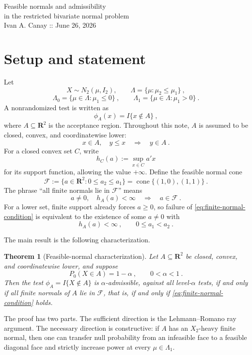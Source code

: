 \documentclass[12pt]{article}
\newtheorem{theorem}{Theorem}
\theoremstyle{remark}
\begin{document}
\begin{center}
{\Large Feasible normals and admissibility\\ in the restricted bivariate normal problem}\\[3pt]
{\small Ivan A. Canay :: June 26, 2026} 
\end{center}

\medskip

\section*{Setup and statement}

Let
\[
X\sim N_2(\mu,I_2),
\qquad
\Lambda=\{\mu:\mu_2\le \mu_1\}~,
\]
\[
\Lambda_0=\{\mu\in\Lambda:\mu_1\le0\}~,
\qquad
\Lambda_1=\{\mu\in\Lambda:\mu_1>0\}~.
\]
A nonrandomized test is written as
\[
\phi_A(x)=I\{x\notin A\}~,
\]
where $A\subseteq\mathbf R^2$ is the acceptance region.  Throughout this note,
$A$ is assumed to be closed, convex, and coordinatewise lower:
\[
x\in A,
\quad y\le x
\quad\Longrightarrow\quad
 y\in A~.
\]
For a closed convex set $C$, write
\[
h_C(a):=\sup_{x\in C}a'x
\]
for its support function, allowing the value $+\infty$.  Define the feasible normal cone
\[
\mathcal F:=\{a\in\mathbf R^2:0\le a_2\le a_1\}
=\operatorname{cone}\{(1,0),(1,1)\}~.
\]
The phrase ``all finite normals lie in $\mathcal F$'' means
\begin{equation}\label{eq:finite-normal-condition}
    a\ne0,
    \quad h_A(a)<\infty
    \quad\Longrightarrow\quad
    a\in\mathcal F~.
\end{equation}
For a lower set, finite support already forces $a\ge0$, so failure of
\eqref{eq:finite-normal-condition} is equivalent to the existence of some
$a\ne0$ with
\[
h_A(a)<\infty~,
\qquad
0\le a_1<a_2~.
\]

The main result is the following characterization.

\begin{theorem}[Feasible-normal characterization]\label{thm:iff}
Let $A\subseteq\mathbf R^2$ be closed, convex, and coordinatewise lower, and suppose
\[
P_0(X\in A)=1-\alpha~,
\qquad 0<\alpha<1~.
\]
Then the test $\phi_A=I\{X\notin A\}$ is $\alpha$-admissible, against all level-$\alpha$ tests, if and only if all finite normals of $A$ lie in $\mathcal F$, that is, if and only if \eqref{eq:finite-normal-condition} holds.
\end{theorem}

The proof has two parts.  The sufficient direction is the Lehmann--Romano ray argument.  The necessary direction is constructive: if $A$ has an $X_2$-heavy finite normal, then one can transfer null probability from an infeasible face to a feasible diagonal face and strictly increase power at every $\mu\in\Lambda_1$.
\end{document}
